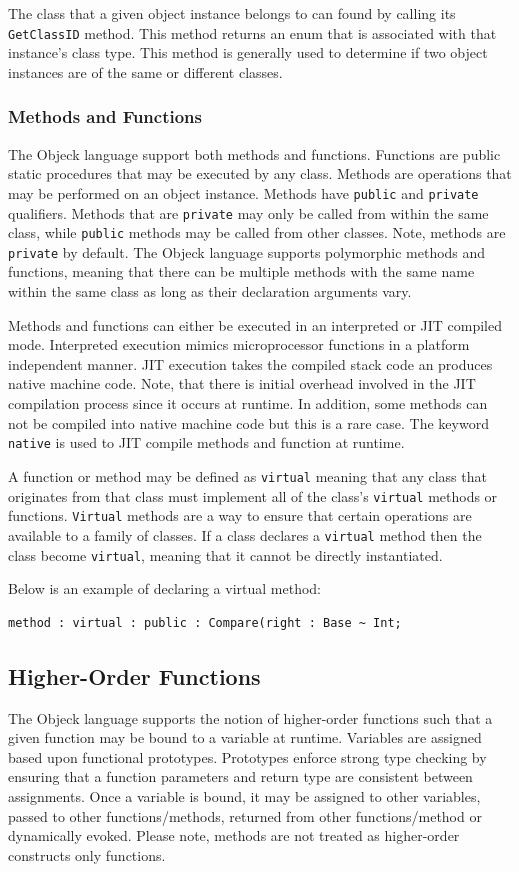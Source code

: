 \documentclass[12pt]{article}
\begin{document}
The class that a given object instance belongs to can found by calling its \texttt{GetClassID} method.  This method returns an enum that is associated with that instance's class type.  This method is generally used to determine if two object instances are of the same or different classes.

\subsubsection{Methods and Functions}
The Objeck language support both methods and functions.  Functions are public static procedures that may be executed by any class.  Methods are operations that may be performed on an object instance.  Methods have \texttt{public} and \texttt{private} qualifiers.  Methods that are \texttt{private} may only be called from within the same class, while \texttt{public} methods may be called from other classes.  Note, methods are \texttt{private} by default. The Objeck language supports polymorphic methods and functions, meaning that there can be multiple methods with the same name within the same class as long as their declaration arguments vary.

Methods and functions can either be executed in an interpreted or JIT compiled mode. Interpreted execution mimics microprocessor functions in a platform independent manner. JIT execution takes the compiled stack code an produces native machine code. Note, that there is initial overhead involved in the JIT compilation process since it occurs at runtime. In addition, some methods can not be compiled into native machine code but this is a rare case.  The keyword \texttt{native} is used to JIT compile methods and function at runtime.

A function or method may be defined as \texttt{virtual} meaning that any class that originates from that class must implement all of the class's \texttt{virtual} methods or functions.  \texttt{Virtual} methods are a way to ensure that certain operations are available to a family of classes. If a class declares a \texttt{virtual} method then the class become \texttt{virtual}, meaning that it cannot be directly instantiated.

Below is an example of declaring a virtual method:
\begin{verbatim}
method : virtual : public : Compare(right : Base ~ Int;
\end{verbatim}

\subsection{Higher-Order Functions}
The Objeck language supports the notion of higher-order functions such that a given function may be bound to a variable at runtime.  Variables are assigned based upon functional prototypes.  Prototypes enforce strong type checking by ensuring that a function parameters and return type are consistent between assignments.  Once a variable is bound, it may be assigned to other variables, passed to other functions/methods, returned from other functions/method or dynamically evoked.  Please note, methods are not treated as higher-order constructs only functions.  
\end{document}
